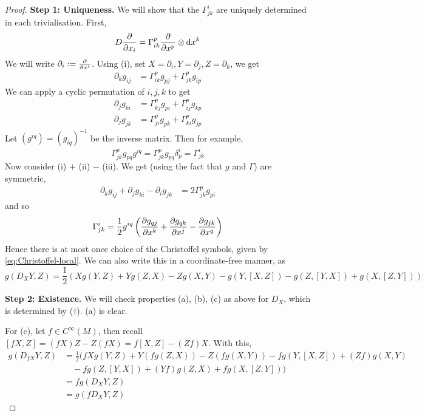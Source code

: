 \documentclass{article}
\begin{document}
\begin{proof}
    \textbf{Step 1: Uniqueness.} We will show that the \(\Gamma^i_{jk}\) are uniquely determined in each trivialisation. First,
    \[D\pdv{x_i} = \Gamma^p_{ik}\pdv{x^p} \otimes \dd x^k\]
    We will write \(\partial_i := \pdv{x^i}\). Using (i), set \(X = \partial_i, Y = \partial_j, Z = \partial_k\), we get
    \begin{align*}
        \partial_k g_{ij} &= \Gamma^p_{ik}g_{pj} + \Gamma^p_{jk}g_{ip} \tag{i}
    \end{align*}
    We can apply a cyclic permutation of \(i, j, k\) to get
    \begin{align*}
        \partial_jg_{ki} &= \Gamma^p_{kj}g_{pi} + \Gamma^p_{ij}g_{kp} \tag{ii} \\
        \partial_jg_{jk} &= \Gamma^p_{ji}g_{pk} + \Gamma^p_{ki}g_{jp} \tag{iii}
    \end{align*}
    Let \((g^{iq}) = (g_{iq})^{-1}\) be the inverse matrix. Then for example, 
    \[\Gamma^p_{jk}g_{pq}g^{iq} = \Gamma^p_{jk}g_{pq}\delta^i_p = \Gamma^i_{jk}\]
    Now consider (i) \(+\) (ii) \(-\) (iii). We get (using the fact that \(g\) and \(\Gamma\)) are symmetric,
    \begin{align*}
        \partial_k g_{ij} + \partial_j g_{ki} - \partial_i g_{jk} &= 2\Gamma^p_{jk}g_{pi}
    \end{align*}
    and so
    \begin{equation}
        \label{eq:Christoffel-local}
        \Gamma^i_{jk} = \frac{1}{2}g^{iq}\left(\pdv{g_{qj}}{x^k} + \pdv{g_{qk}}{x^j} - \pdv{g_{jk}}{x^q}\right)
    \end{equation}
    Hence there is at most once choice of the Christoffel symbols, given by \cref{eq:Christoffel-local}. We can also write this in a coordinate-free manner, as
    \[g(D_XY, Z) = \frac{1}{2}\left(Xg(Y, Z) + Yg(Z, X) - Zg(X, Y) - g(Y, [X, Z]) - g(Z, [Y, X]) + g(X, [Z, Y])\right) \tag{\(\dagger\)}\]

    \textbf{Step 2: Existence.} We will check properties (a), (b), (c) as above for \(D_X\), which is determined by (\(\dagger\)). (a) is clear.

    For (c), let \(f \in C^\infty(M)\), then recall \([fX, Z] = (fX)Z - Z(fX) = f[X, Z] - (Zf)X\). With this,
    \begin{align*}
        g(D_{fX}Y, Z)&= \frac{1}{2}\big(fX g(Y, Z) + Y(fg(Z, X)) - Z(fg(X, Y)) - fg(Y, [X, Z]) + (Zf)g(X, Y) \\
        &\quad-fg(Z, [Y, X]) + (Yf)g(Z, X) + fg(X, [Z, Y])\big) \\
        &= fg(D_XY, Z) \\
        &= g(f D_XY, Z)
    \end{align*}


\end{proof}
\end{document}
